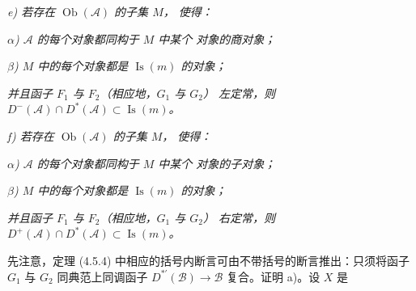\noindent\textit{e) 若存在 $\operatorname{Ob}(\mathcal A)$ 的子集 $M$，
使得：}

\noindent\textit{$\alpha$) $\mathcal A$ 的每个对象都同构于 $M$ 中某个
对象的商对象；}

\noindent\textit{$\beta$) $M$ 中的每个对象都是
$\operatorname{Is}(m)$ 的对象；}

\noindent\textit{并且函子 $F_1$ 与 $F_2$（相应地，$G_1$ 与 $G_2$）
左定常，则
$D^-(\mathcal A)\cap D^*(\mathcal A)\subset\operatorname{Is}(m)$。}

\noindent\textit{f) 若存在 $\operatorname{Ob}(\mathcal A)$ 的子集 $M$，
使得：}

\noindent\textit{$\alpha$) $\mathcal A$ 的每个对象都同构于 $M$ 中某个
对象的子对象；}

\noindent\textit{$\beta$) $M$ 中的每个对象都是
$\operatorname{Is}(m)$ 的对象；}

\noindent\textit{并且函子 $F_1$ 与 $F_2$（相应地，$G_1$ 与 $G_2$）
右定常，则
$D^+(\mathcal A)\cap D^*(\mathcal A)\subset\operatorname{Is}(m)$。}

先注意，定理 (4.5.4) 中相应的括号内断言可由不带括号的断言推出：只须将函子
$G_1$ 与 $G_2$ 同典范上同调函子
$D^{*'}(\mathcal B)\longrightarrow\mathcal B$ 复合。证明 a)。设 $X$ 是
\endgroup
